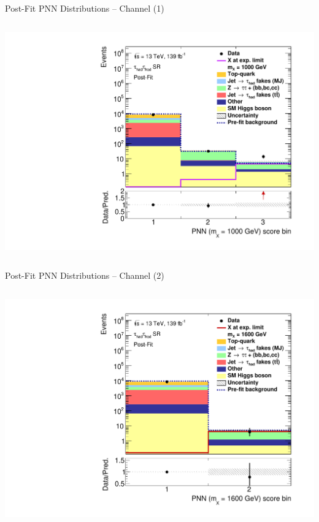 \documentclass[11pt, xcolor={dvipsnames}, aspectratio=169]{beamer}
\begin{document}
\begin{frame}{Post-Fit PNN Distributions -- \allbold{\hadhad} Channel (1)}
\begin{columns}
    \centering


    \includegraphics[width=\textwidth]{results_res/postfit/Region_BMin0_incJet1_distPNN1000_J2_Y2015_DLLOS_T2_SpcTauHH_L0_GlobalFit_conditionnal_mu0log}
  \end{columns}
\end{frame}


\begin{frame}{Post-Fit PNN Distributions -- \allbold{\hadhad} Channel (2)}
  \begin{columns}
    \centering


    \includegraphics[width=\textwidth]{results_res/postfit/Region_BMin0_incJet1_distPNN1600_J2_Y2015_DLLOS_T2_SpcTauHH_L0_GlobalFit_conditionnal_mu0log}

  \end{columns}
\end{frame}
\end{document}
